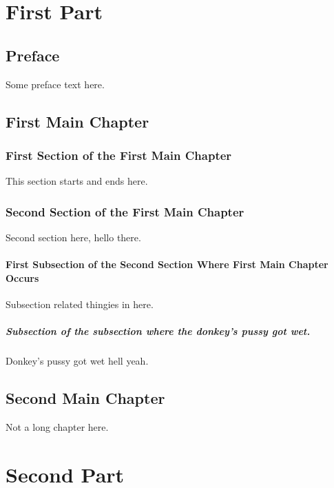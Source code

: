 \documentclass[openany]{book}
\begin{document}
    \tableofcontents

    \part{First Part}
    \chapter*{Preface}
    Some preface text here.
    \chapter{First Main Chapter}
    \section{First Section of the First Main Chapter}
    This section starts and ends here.
    \section{Second Section of the First Main Chapter}
    Second section here, hello there.
    \subsection{First Subsection of the Second Section Where First Main Chapter Occurs}
    Subsection related thingies in here.
    \subsubsection[A Deeper Subsection]{Subsection of the subsection where the donkey's pussy got wet.}
    Donkey's pussy got wet hell yeah.
    \chapter{Second Main Chapter}
    Not a long chapter here.

    \part{Second Part}
\end{document}
